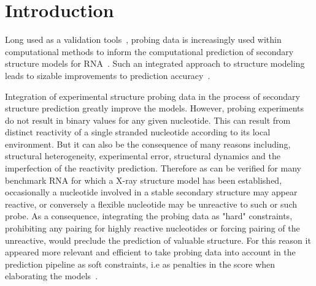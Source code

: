 \documentclass[a4,center,fleqn]{NAR}
\begin{document}


\section{Introduction}


Long used as a validation tools~\cite{xx}, probing data is increasingly used within computational methods to inform the computational prediction of  secondary structure models for RNA~\cite{yy}. Such an integrated approach to structure modeling leads to sizable improvements to prediction accuracy~\cite{zz}.


Integration of experimental structure probing data in the process of secondary structure prediction greatly improve the models. However, probing experiments do not result in binary values for any given nucleotide. This can result from distinct reactivity of a single stranded nucleotide according to its local environment. But it can also be the consequence of many reasons including, structural heterogeneity, experimental error, structural dynamics and the imperfection of the reactivity prediction. Therefore as can be verified for many benchmark RNA for which a X-ray structure model has been established, occasionally a nucleotide involved in a stable secondary structure may appear reactive, or conversely a flexible nucleotide may be unreactive to such or such probe. As a consequence, integrating the probing data as "hard" constraints, prohibiting any pairing for highly reactive nucleotides or forcing pairing of the unreactive, would preclude the prediction of valuable structure. For this reason it appeared more relevant and efficient to take probing data into account in the prediction pipeline as soft constraints, i.e as penalties in the score when elaborating the models~\cite{Deigan2009,Washietl2012,Zarringhalam2012}. 
\enlargethispage{-65.1pt}
\end{document}
